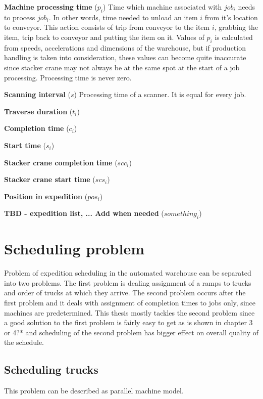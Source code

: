 \documentclass{ctuthesis}
\begin{document}
\noindent \textbf{Machine processing time} ($p_i$) Time which machine associated with $job_i$ needs to process $job_i$. In other words, time needed to unload an item $i$ from it's location to conveyor. This action consists of trip from conveyor to the item $i$, grabbing the item, trip back to conveyor and putting the item on it. Values of $p_i$ is calculated from speeds, accelerations and dimensions of the warehouse, but if production handling is taken into consideration, these values can become quite inaccurate since stacker crane may not always be at the same spot at the start of a job processing. Processing time is never zero.


\noindent \textbf{Scanning interval} ($s$) Processing time of a scanner. It is equal for every job.

\noindent \textbf{Traverse duration} ($t_i$)

\noindent \textbf{Completion time} ($c_i$)

\noindent \textbf{Start time} ($s_i$)

\noindent \textbf{Stacker crane completion time} ($scc_i$)

\noindent \textbf{Stacker crane start time} ($scs_i$)

\noindent \textbf{Position in expedition} ($pos_i$)

\noindent \textbf{TBD - expedition list, ... Add when needed} ($something_i$)


\section{Scheduling problem}
 
 Problem of expedition scheduling in the automated warehouse can be separated into two problems. The first problem is dealing assignment of a ramps to trucks and order of trucks at which they arrive. The second problem occurs after the first problem and it deals with assignment of completion times to jobs only, since machines are predetermined. This thesis mostly tackles the second problem since a good solution to the first problem is fairly easy to get as is shown in chapter 3 or 4?* and scheduling of the second problem has bigger effect on overall quality of the schedule.
 
 \subsection{Scheduling trucks}
 
 This problem can be described as parallel machine model.
 
\end{document}
